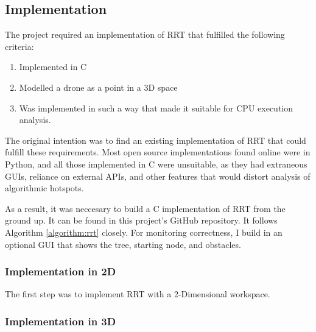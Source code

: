 \subsection{Implementation}
    
    The project required an implementation of RRT that fulfilled the following criteria:

    \begin{enumerate}
        \item Implemented in C
        \item Modelled a drone as a point in a 3D space
        \item Was implemented in such a way that made it suitable for CPU execution analysis.
    \end{enumerate}

    The original intention was to find an existing implementation of RRT that could fulfill these requirements. Most open source implementations found online were in Python, and all those implemented in C were unsuitable\cite{RoboJackets2019}\cite{Planning2019}\cite{Sourishg2017}\cite{Vss2sn2019}, as they had extraneous \ac{GUI}s, reliance on external \ac{API}s, and other features that would distort analysis of algorithmic hotspots.

    As a result, it was neccesary to build a C implementation of RRT from the ground up. It can be found in this project's GitHub repository. It follows Algorithm \ref{algorithm:rrt} closely. For monitoring correctness, I build in an optional \ac{GUI} that shows the tree, starting node, and obstacles. 

    \subsubsection{Implementation in 2D}
    The first step was to implement RRT with a 2-Dimensional workspace. 
    

    \subsubsection{Implementation in 3D}
    

    


